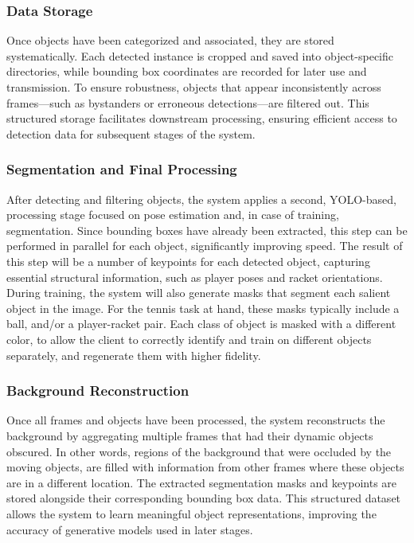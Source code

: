 \documentclass[sigconf, screen, review, anonymous]{acmart}
\begin{document}
\subsubsection{Data Storage}
Once objects have been categorized and associated, they are stored systematically. Each detected instance is cropped and saved into object-specific directories, while bounding box coordinates are recorded for later use and transmission. 
To ensure robustness, objects that appear inconsistently across frames—such as bystanders or erroneous detections—are filtered out.
This structured storage facilitates downstream processing, ensuring efficient access to detection data for subsequent stages of the system.

\subsubsection{Segmentation and Final Processing}
After detecting and filtering objects, the system applies a second, YOLO-based, processing stage focused on pose estimation and, in case of training, segmentation. Since bounding boxes have already been extracted, this step can be performed in parallel for each object, significantly improving speed.
The result of this step will be a number of keypoints for each detected object, capturing essential structural information, such as player poses and racket orientations. 
During training, the system will also generate masks that segment each salient object in the image. For the tennis task at hand, these masks typically include a ball, and/or a player-racket pair. Each class of object is masked with a different color, to allow the client to correctly identify and train on different objects separately, and regenerate them with higher fidelity.

\subsubsection{Background Reconstruction}
Once all frames and objects have been processed, the system reconstructs the background by aggregating multiple frames that had their dynamic objects obscured. In other words, regions of the background that were occluded by the moving objects, are filled with information from other frames where these objects are in a different location.
The extracted segmentation masks and keypoints are stored alongside their corresponding bounding box data. This structured dataset allows the system to learn meaningful object representations, improving the accuracy of generative models used in later stages.
\end{document}
